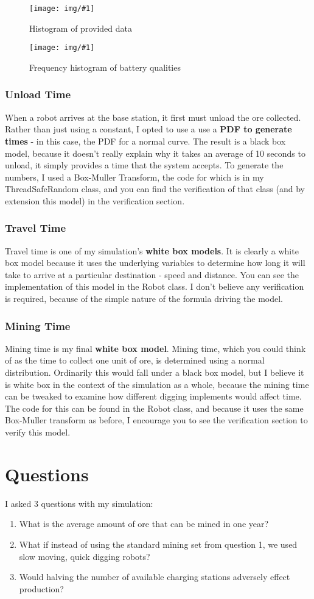 \documentclass{article}
\newcommand{\img}[2]{
	\begin{figure}[ht!]
		\texttt{[image: img/\#1]}
		\centering
		\caption{#2}
	\end{figure}
}
\begin{document}
\img{batteryQualityHistogram.png}{Histogram of provided data}
\img{batteryQualtiyFrequencyData.png}{Frequency histogram of battery qualities}

\subsubsection{Unload Time}
When a robot arrives at the base station, it first must unload the ore collected.
Rather than just using a constant, I opted to use a use a \textbf{PDF to generate times} - in this case, the PDF for a normal curve.
The result is a black box model, because it doesn't really explain why it takes an average of 10 seconds to unload, it simply provides a time that the system accepts.
To generate the numbers, I used a Box-Muller Transform, the code for which is in my ThreadSafeRandom class, and you can find the verification of that class (and by extension this model) in the verification section.

\subsubsection{Travel Time}
Travel time is one of my simulation's \textbf{white box models}. 
It is clearly a white box model because it uses the underlying variables to determine how long it will take to arrive at a particular destination - speed and distance.
You can see the implementation of this model in the Robot class. I don't believe any verification is required, because of the simple nature of the formula driving the model.

\subsubsection{Mining Time}
Mining time is my final \textbf{white box model}.
Mining time, which you could think of as the time to collect one unit of ore, is determined using a normal distribution.
Ordinarily this would fall under a black box model, but I believe it is white box in the context of the simulation as a whole, because the mining time can be tweaked to examine how different digging implements would affect time. The code for this can be found in the Robot class, and because it uses the same Box-Muller transform as before, I encourage you to see the verification section to verify this model.
\clearpage

\section{Questions}
I asked 3 questions with my simulation:
\begin{enumerate}
\item What is the average amount of ore that can be mined in one year?
\item What if instead of using the standard mining set from question 1, we used slow moving, quick digging robots?
\item Would halving the number of available charging stations adversely effect production?
\end{enumerate}
\end{document}
